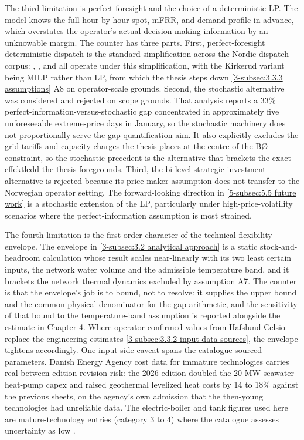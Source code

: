 The third limitation is perfect foresight and the choice of a deterministic LP. The model knows the full hour-by-hour spot, mFRR, and demand profile in advance, which overstates the operator's actual decision-making information by an unknowable margin. The counter has three parts. First, perfect-foresight deterministic dispatch is the standard simplification across the Nordic dispatch corpus: \cite{kirkerud_impacts_2016}, \cite{johannsen_incentivising_2021}, and \cite{tromborg_flexible_2017} all operate under this simplification, with the Kirkerud variant being MILP rather than LP, from which the thesis steps down \autoref{3-subsec:3.3.3 assumptions} A8 on operator-scale grounds. Second, the stochastic alternative \cite{ottesen_multi_2018} was considered and rejected on scope grounds. That analysis reports a $33\%$ perfect-information-versus-stochastic gap concentrated in approximately five unforeseeable extreme-price days in January, so the stochastic machinery does not proportionally serve the gap-quantification aim. It also explicitly excludes the grid tariffs and capacity charges the thesis places at the centre of the BØ constraint, so the stochastic precedent is the alternative that brackets the exact effektledd the thesis foregrounds. Third, the bi-level strategic-investment alternative \cite{tan_strategic_2022} is rejected because its price-maker assumption does not transfer to the Norwegian operator setting. The forward-looking direction in \autoref{5-subsec:5.5 future work} is a stochastic extension of the LP, particularly under high-price-volatility scenarios where the perfect-information assumption is most strained.

The fourth limitation is the first-order character of the technical flexibility envelope. The envelope in \autoref{3-subsec:3.2 analytical approach} is a static stock-and-headroom calculation whose result scales near-linearly with its two least certain inputs, the network water volume and the admissible temperature band, and it brackets the network thermal dynamics excluded by assumption A7. The counter is that the envelope's job is to bound, not to resolve: it supplies the upper bound and the common physical denominator for the gap arithmetic, and the sensitivity of that bound to the temperature-band assumption is reported alongside the estimate in Chapter 4. Where operator-confirmed values from Hafslund Celsio replace the engineering estimates \autoref{3-subsec:3.3.2 input data sources}, the envelope tightens accordingly. One input-side caveat spans the catalogue-sourced parameters. Danish Energy Agency cost data for immature technologies carries real between-edition revision risk: the 2026 edition doubled the 20 MW seawater heat-pump capex and raised geothermal levelized heat costs by 14 to 18\% against the previous sheets, on the agency's own admission that the then-young technologies had unreliable data. The electric-boiler and tank figures used here are mature-technology entries (category 3 to 4) where the catalogue assesses uncertainty as low \cite{danish_energy_agency_technology_2024}.



\newpage